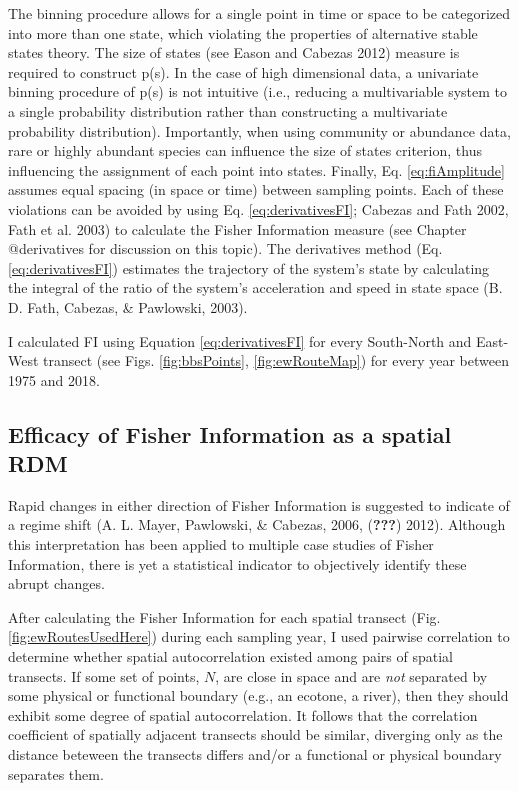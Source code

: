 \documentclass[12pt,twoside,openany]{reedthesis}
\begin{document}
The binning procedure allows for a single point in time or space to be
categorized into more than one state, which violating the properties of
alternative stable states theory. The size of states (see Eason and
Cabezas 2012) measure is required to construct p(s). In the case of high
dimensional data, a univariate binning procedure of p(s) is not
intuitive (i.e., reducing a multivariable system to a single probability
distribution rather than constructing a multivariate probability
distribution). Importantly, when using community or abundance data, rare
or highly abundant species can influence the size of states criterion,
thus influencing the assignment of each point into states. Finally, Eq.
\eqref{eq:fiAmplitude} assumes equal spacing (in space or time) between
sampling points. Each of these violations can be avoided by using Eq.
\eqref{eq:derivativesFI}; Cabezas and Fath 2002, Fath et al. 2003) to
calculate the Fisher Information measure (see Chapter @derivatives for
discussion on this topic). The derivatives method (Eq.
\eqref{eq:derivativesFI}) estimates the trajectory of the system's state
by calculating the integral of the ratio of the system's acceleration
and speed in state space (B. D. Fath, Cabezas, \& Pawlowski, 2003).

I calculated FI using Equation \eqref{eq:derivativesFI} for every
South-North and East-West transect (see Figs. \ref{fig:bbsPoints},
\ref{fig:ewRouteMap}) for every year between 1975 and 2018.

\subsection{Efficacy of Fisher Information as a spatial
RDM}\label{efficacy-of-fisher-information-as-a-spatial-rdm}

Rapid changes in either direction of Fisher Information is suggested to
indicate of a regime shift (A. L. Mayer, Pawlowski, \& Cabezas, 2006,
({\textbf{???}}) 2012). Although this interpretation has been applied to
multiple case studies of Fisher Information, there is yet a statistical
indicator to objectively identify these abrupt changes.

After calculating the Fisher Information for each spatial transect (Fig.
\ref{fig:ewRoutesUsedHere}) during each sampling year, I used pairwise
correlation to determine whether spatial autocorrelation existed among
pairs of spatial transects. If some set of points, \(N\), are close in
space and are \emph{not} separated by some physical or functional
boundary (e.g., an ecotone, a river), then they should exhibit some
degree of spatial autocorrelation. It follows that the correlation
coefficient of spatially adjacent transects should be similar, diverging
only as the distance beteween the transects differs and/or a functional
or physical boundary separates them.
\end{document}
